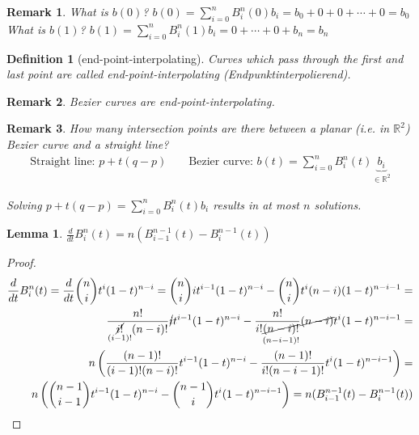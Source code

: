 \documentclass[]{article}
\newtheorem{lemma}{Lemma}
\newtheorem{definition}{Definition}
\newtheorem{remark}{Remark}
\begin{document}
\begin{remark}
	What is $b(0)$? \hspace{1cm} $b(0)=\sum_{i=0}^{n} B_i^n(0) b_i = b_0 + 0 + 0 + \cdots + 0 = b_0$\\
	What is $b(1)$? \hspace{1cm} $b(1)=\sum_{i=0}^{n} B_i^n(1) b_i = 0 + \cdots + 0 + b_n = b_n$
\end{remark}

\begin{definition}[end-point-interpolating]
	Curves which pass through the first and last point are called end-point-interpolating (Endpunktinterpolierend).
\end{definition}

\begin{remark}
	Bezier curves are end-point-interpolating.
\end{remark}

\begin{remark}
	How many intersection points are there between a planar (i.e. in $\mathbb{R}^2$) Bezier curve and a straight line?
	\begin{align*}
		\text{Straight line: } p + t(q-p) && \text{ Bezier curve: } b(t) = \sum_{i=0}^{n} B_i^n(t) \underbrace{b_i}_{\in \mathbb{R}^2}
	\end{align*}
	
	Solving $p+t(q-p) = \sum_{i=0}^{n} B_i^n(t) b_i$ results in at most $n$ solutions.
\end{remark}

\begin{lemma}
	$\frac{d}{dt}B_i^n(t) = n(B_{i-1}^{n-1}(t) - B_i^{n-1}(t))$
\end{lemma}

\begin{proof}
	\begin{align*}
		\frac{d}{dt}B_i^n(t) = \frac{d}{dt} \binom{n}{i} t^i (1-t)^{n-i} = \binom{n}{i} i t^{i-1} (1-t)^{n-i} - \binom{n}{i} t^i (n-i) (1-t)^{n-i-1} =\\
		\frac{n!}{\underset{(i-1)!}{\cancel{i!}}(n-i)!} \cancel{i} t^{i-1} (1-t)^{n-i} - \frac{n!}{i!\underset{(n-i-1)!}{\cancel{(n-i)!}}}\cancel{(n-i)}t^i (1-t)^{n-i-1} =\\
		n \left(\frac{(n-1)!}{(i-1)!(n-i)!}t^{i-1}(1-t)^{n-i} - \frac{(n-1)!}{i!(n-i-1)!} t^i (1-t)^{n-i-1}\right) =\\
		n \left(\binom{n-1}{i-1}t^{i-1}(1-t)^{n-i} - \binom{n-1}{i} t^i (1-t)^{n-i-1}\right) = n(B_{i-1}^{n-1}(t) - B_i^{n-1}(t))
	\end{align*}
\end{proof}
\end{document}
